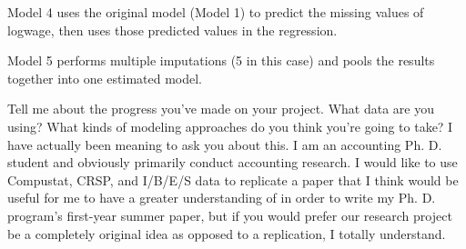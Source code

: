\documentclass{article}
\begin{document}
Model 4 uses the original model (Model 1) to predict the missing values of logwage, then uses those predicted values in the regression.

Model 5 performs multiple imputations (5 in this case) and pools the results together into one estimated model.

Tell me about the progress you’ve made on your project. What data are you using?
What kinds of modeling approaches do you think you’re going to take? I have actually been meaning to ask you about this. I am an accounting Ph. D. student and obviously primarily conduct accounting research. I would like to use Compustat, CRSP, and I/B/E/S data to replicate a paper that I think would be useful for me to have a greater understanding of in order to write my Ph. D. program's first-year summer paper, but if you would prefer our research project be a completely original idea as opposed to a replication, I totally understand.
\end{document}

